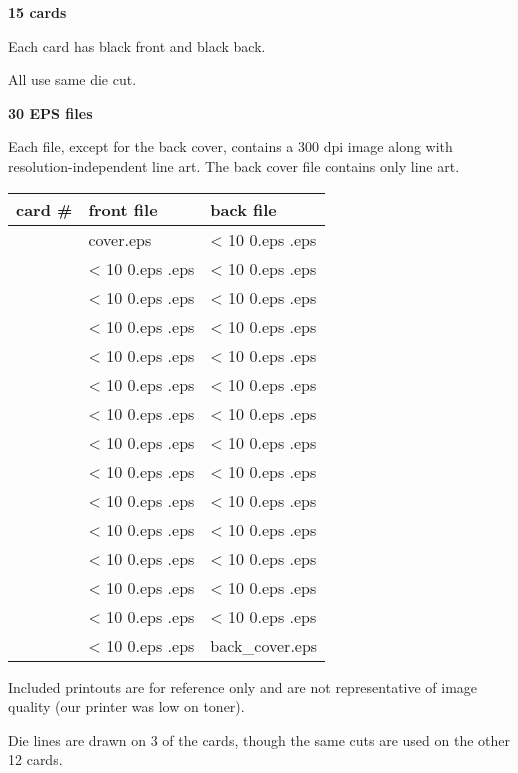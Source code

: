 \documentclass[12pt]{article}
\begin{document}
{\bf 15 cards}

Each card has black front and black back.

All use same die cut.

\vspace{1in}

{\bf 30 EPS files}

Each file, except for the back cover, contains a 300 dpi image along with resolution-independent line art.
The back cover file contains only line art.

\begin{center}




\setcounter{cardNumber}{1}
\setcounter{fileNumber}{1}


\newcommand{\printCardNumber} {
	\arabic{cardNumber}
    \addtocounter{cardNumber}{1}
}


\newcommand{\printFileName} {
    \ifnum \value{fileNumber} < 10
        0\arabic{fileNumber}.eps
    \else
        \arabic{fileNumber}.eps
    \fi
    \addtocounter{fileNumber}{1}
}



\newcommand{\lineInTable} {
    \printCardNumber & \printFileName & \printFileName\\
    \hline
}



\begin{tabular}{l||l|l}
{\bf card} \# & {\bf front file} & {\bf back file}\\
\hline
\hline
\printCardNumber & cover.eps & \printFileName\\
\hline
\lineInTable
\lineInTable
\lineInTable
\lineInTable
\lineInTable
\lineInTable
\lineInTable
\lineInTable
\lineInTable
\lineInTable
\lineInTable
\lineInTable
\lineInTable

\printCardNumber & \printFileName & back\_cover.eps\\

\end{tabular}

\end{center}



\vspace{1in}

Included printouts are for reference only and are not representative of image quality (our printer was low on toner).

Die lines are drawn on 3 of the cards, though the same cuts are used on the other 12 cards.
\end{document}
